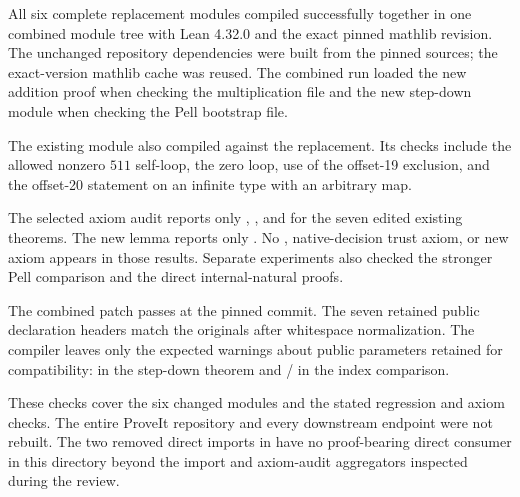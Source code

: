 All six complete replacement modules compiled successfully together in one
combined module tree with Lean 4.32.0 and the exact pinned mathlib revision.
The unchanged repository dependencies were built from the pinned sources;
the exact-version mathlib cache was reused. The combined run loaded the new
addition proof when checking the multiplication file and the new step-down
module when checking the Pell bootstrap file.

The existing  module also compiled against
the replacement. Its checks include the allowed nonzero $511$ self-loop,
the zero loop, use of the offset-19 exclusion, and the offset-20 statement
on an infinite type with an arbitrary map.

The selected axiom audit reports only
, , and  for the seven
edited existing theorems. The new  lemma reports
only . No , native-decision trust axiom, or new
axiom appears in those results. Separate experiments also checked the
stronger Pell comparison and the direct internal-natural proofs.

The combined patch passes  at the pinned commit.
The seven retained public declaration headers match the originals after
whitespace normalization. The compiler leaves only the expected warnings
about public parameters retained for compatibility:  in the
step-down theorem and / in the index comparison.

These checks cover the six changed modules and the stated regression and
axiom checks. The entire ProveIt repository and every downstream endpoint
were not rebuilt. The two removed direct imports in  have
no proof-bearing direct consumer in this directory beyond the import and
axiom-audit aggregators inspected during the review.
